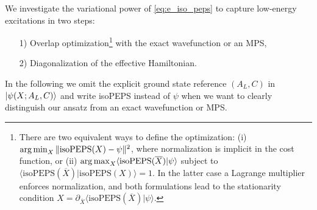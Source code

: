We investigate the variational power of \eqref{eq:e_iso_peps} to capture low-energy excitations in two steps: 
\begin{enumerate}
	\item[1)] \vspace*{-0.15em} Overlap optimization\footnote{There are two equivalent ways to define the optimization: (i) $\operatorname*{arg\,min}_X \Vert \text{isoPEPS}(X) - \psi \Vert^2$, where normalization is implicit in the cost function, or (ii) $\operatorname*{arg\,max}_X \langle \text{isoPEPS}(\overline{X})\vert \psi \rangle$ subject to $\langle \text{isoPEPS}(\overline{X})\vert \text{isoPEPS}(X)\rangle = 1$. In the latter case a Lagrange multiplier enforces normalization, and both formulations lead to the stationarity condition $X = \partial_{\overline{X}} \langle \text{isoPEPS}(\overline{X}) \vert \psi \rangle$.} with the exact wavefunction or an MPS, 
	\item[2)] \vspace*{-0.5em} Diagonalization of the effective Hamiltonian. 
\end{enumerate}
\vspace*{-0.15em}
In the following we omit the explicit ground state reference $(A_L, C)$ in $\ket{\psi(X; A_L, C)} $ and write isoPEPS instead of $\psi$ when we want to clearly distinguish our ansatz from an exact wavefunction or MPS. \\[0.3em]


